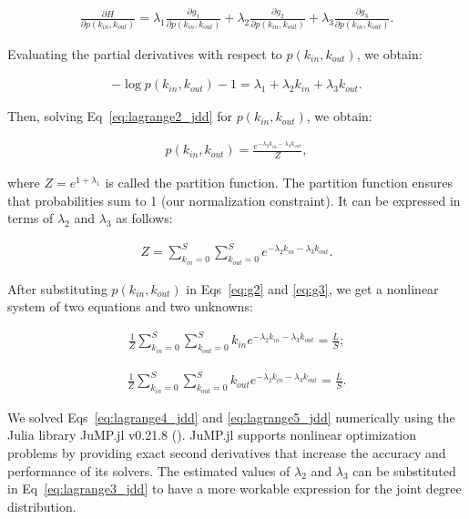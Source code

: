 \begin{eqnarray}
\label{eq:lagrange_jdd}
        \frac{\partial H}{\partial p(k_{in},k_{out})} = \lambda_1 \frac{\partial
        g_1}{\partial p(k_{in},k_{out})} + \lambda_2 \frac{\partial
        g_2}{\partial p(k_{in},k_{out})}+ \lambda_3 \frac{\partial g_3}{\partial
        p(k_{in},k_{out})}.
\end{eqnarray}

Evaluating the partial derivatives with respect to $p(k_{in},k_{out})$, we
obtain:

\begin{eqnarray}
\label{eq:lagrange2_jdd}
        -\log p(k_{in},k_{out}) - 1 = \lambda_1 + \lambda_2 k_{in} + \lambda_3
        k_{out}.
\end{eqnarray}

Then, solving Eq~\ref{eq:lagrange2_jdd} for $p(k_{in},k_{out})$, we obtain:

\begin{eqnarray}
\label{eq:lagrange3_jdd}
        p(k_{in},k_{out}) = \frac{e^{-\lambda_2k_{in}-\lambda_3k_{out}}}{Z},
\end{eqnarray}

where $Z = e^{1+\lambda_1}$ is called the partition function. The partition
function ensures that probabilities sum to 1 (our normalization constraint). It
can be expressed in terms of $\lambda_2$ and $\lambda_3$ as follows:

\begin{eqnarray}
\label{eq:Z}
       Z = \sum_{k_{in}=0}^S\sum_{k_{out}=0}^S
       e^{-\lambda_2k_{in}-\lambda_3k_{out}}.
\end{eqnarray}

After substituting $p(k_{in},k_{out})$ in Eqs~\ref{eq:g2} and \ref{eq:g3},
we get a nonlinear system of two equations and two unknowns:

\begin{eqnarray}
\label{eq:lagrange4_jdd}
       \frac{1}{Z}\sum_{k_{in}=0}^S\sum_{k_{out}=0}^S k_{in}
       e^{-\lambda_2k_{in}-\lambda_3k_{out}}  = \frac{L}{S};
\end{eqnarray}

\begin{eqnarray}
\label{eq:lagrange5_jdd}
       \frac{1}{Z}\sum_{k_{in}=0}^S\sum_{k_{out}=0}^S k_{out}
       e^{-\lambda_2k_{in}-\lambda_3k_{out}}  = \frac{L}{S}.
\end{eqnarray}

We solved Eqs~\ref{eq:lagrange4_jdd} and \ref{eq:lagrange5_jdd} numerically
using the Julia library JuMP.jl v0.21.8 (\cite{Dunning2017Jump}). JuMP.jl
supports nonlinear optimization problems by providing exact second derivatives
that increase the accuracy and performance of its solvers. The estimated values
of $\lambda_2$ and $\lambda_3$ can be substituted in Eq~\ref{eq:lagrange3_jdd}
to have a more workable expression for the joint degree distribution. 


